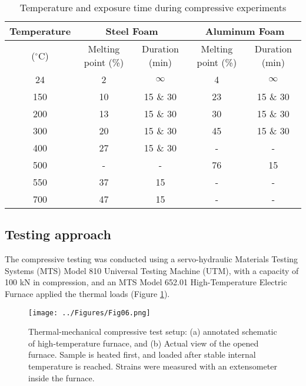 \documentclass[review]{elsarticle}
\begin{document}
\begin{table}[htbp]
	\centering
	\caption{Temperature and exposure time during compressive experiments}
	\begin{tabular}{ccccc}
		\toprule
		{Temperature} & \multicolumn{2}{c}{Steel Foam}  & \multicolumn{2}{c}{Aluminum Foam} \\
		\midrule
		($^{\circ}\mathrm{C}$) & Melting point (\%) & Duration (min) & Melting point (\%) & Duration (min) \\
		\midrule
		24    & 2     & $\infty$     & 4     & $\infty$ \\
		150   & 10    & 15 \& 30 & 23    & 15 \& 30 \\
		200   & 13    & 15 \& 30 & 30    & 15 \& 30 \\
		300   & 20    & 15 \& 30 & 45    & 15 \& 30 \\
		400   & 27    & 15 \& 30 & -     & - \\
		500   & -     & -     & 76    & 15 \\
		550   & 37    & 15    & -     & - \\
		700   & 47    & 15    & -     & - \\
		\bottomrule
	\end{tabular}%
	\label{Tab1}%
\end{table}%

\subsection{Testing approach}

The compressive testing was conducted using a servo-hydraulic Materials Testing Systems (MTS) Model 810 Universal Testing Machine (UTM), with a capacity of 100 kN in compression, and an MTS Model 652.01 High-Temperature Electric Furnace applied the thermal loads (Figure \ref{MTSFurnace}). 

\begin{figure}[htbp]
	\begin{center}
		\texttt{[image: ../Figures/Fig06.png]}
		\caption{Thermal-mechanical compressive test setup: (a) annotated schematic of high-temperature furnace, and (b) Actual view of the opened furnace. Sample is heated first, and loaded after stable internal temperature is reached. Strains were measured with an extensometer inside the furnace.}
		\label{MTSFurnace}
	\end{center}
\end{figure}
\end{document}
